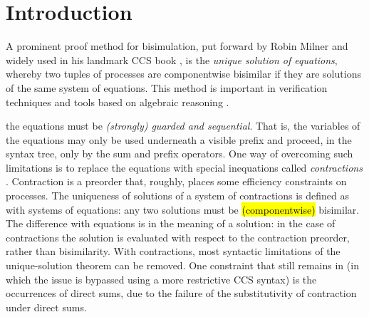 \section{Introduction}

A prominent proof method for bisimulation, put forward by Robin Milner and widely used in his
landmark CCS book \cite{Mil89}, is the
\emph{unique solution of equations}, whereby two tuples of processes are
componentwise bisimilar if they are solutions 
of the same system of equations.
This method is important in verification techniques and tools
based on algebraic reasoning \cite{BaeBOOK,theoryAndPractice,RosUnder10}. 

the equations must be \emph{(strongly) guarded and sequential}. That is, the
variables of the equations may only be used underneath a visible
prefix and proceed, in the syntax tree, only by the sum and prefix operators.
One way of overcoming such limitations is to replace the equations
 with special inequations called
\emph{contractions} \cite{sangiorgi2015equations,sangiorgi2017equations}. Contraction is a
preorder that, roughly, places some efficiency
constraints on processes.  The uniqueness of solutions of a system of contractions
is defined as with systems of equations: any two solutions must be \hl{(componentwise)} bisimilar.
The difference with equations is in the meaning of a solution:
in the case of contractions the solution is evaluated with respect to
the contraction preorder, rather than bisimilarity. 
With contractions, most syntactic limitations of the unique-solution theorem can be
removed.  One constraint that still remains in
\cite{sangiorgi2017equations} (in which the issue is bypassed using a more
restrictive CCS syntax)
is the occurrences of direct sums, due to the failure of the
substitutivity of contraction under direct sums.

